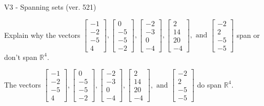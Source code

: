 \begin{exercise}
  \begin{exerciseTitle}V3 - Spanning sets (ver. 521)\end{exerciseTitle}
  \begin{exerciseStatement}
    Explain why the vectors \(\left[\begin{array}{r}
-1 \\
-2 \\
-5 \\
4
\end{array}\right] , \left[\begin{array}{r}
0 \\
-5 \\
-5 \\
-2
\end{array}\right] , \left[\begin{array}{r}
-2 \\
-3 \\
0 \\
-4
\end{array}\right] , \left[\begin{array}{r}
2 \\
14 \\
20 \\
-4
\end{array}\right] , \text{ and } \left[\begin{array}{r}
-2 \\
2 \\
-5 \\
-5
\end{array}\right]\) span or don't span \(\mathbb{R}^4\). 
	


  \end{exerciseStatement}
  \begin{exerciseAnswer}
   The vectors \(\left[\begin{array}{r}
-1 \\
-2 \\
-5 \\
4
\end{array}\right] , \left[\begin{array}{r}
0 \\
-5 \\
-5 \\
-2
\end{array}\right] , \left[\begin{array}{r}
-2 \\
-3 \\
0 \\
-4
\end{array}\right] , \left[\begin{array}{r}
2 \\
14 \\
20 \\
-4
\end{array}\right] , \text{ and } \left[\begin{array}{r}
-2 \\
2 \\
-5 \\
-5
\end{array}\right]\) 
  	 do  
	span \(\mathbb{R}^4\).
  



\end{exerciseAnswer}
\end{exercise}
